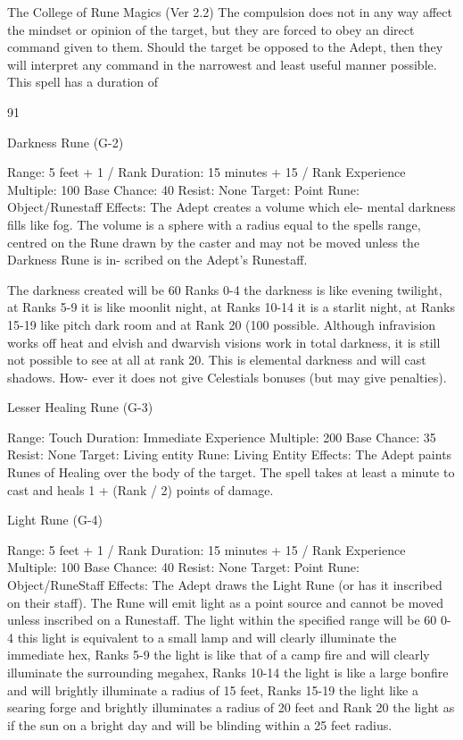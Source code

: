 \begin{Chapter}{The College of Rune Magics (Ver 2.2)}
The  compulsion  does  not  in  any  way  affect  the 
mindset or opinion of the target, but they are forced 
to  obey  an direct  command  given  to them.  Should 
the  target  be  opposed  to  the  Adept,  then  they  will 
interpret  any  command  in  the  narrowest  and  least 
useful manner possible. This spell has a duration of 

91 

Darkness Rune (G-2) 

Range: 5 feet + 1 / Rank 
Duration: 15 minutes + 15 / Rank 
Experience Multiple: 100 
Base Chance: 40%
Resist: None 
Target: Point 
Rune: Object/Runestaff 
Effects:  The  Adept  creates  a  volume  which  ele-
mental  darkness  fills  like  fog.  The  volume  is  a 
sphere  with  a  radius  equal  to  the  spells  range, 
centred  on  the  Rune  drawn  by  the  caster  and  may 
not  be  moved  unless  the  Darkness  Rune  is  in-
scribed on the Adept’s Runestaff. 

The darkness created will be 60%
Ranks  0-4 the  darkness is  like  evening  twilight, at 
Ranks 5-9 it is like moonlit night, at Ranks 10-14 it 
is  a  starlit  night,  at  Ranks  15-19  like  pitch  dark 
room  and  at  Rank  20  (100%
possible.  Although  infravision  works  off  heat  and 
elvish and dwarvish visions work in total darkness, 
it is still not possible to see at all at rank 20. This is 
elemental  darkness  and  will  cast  shadows.  How-
ever  it  does  not  give  Celestials  bonuses  (but  may 
give penalties). 

Lesser Healing Rune (G-3) 

Range: Touch 
Duration: Immediate 
Experience Multiple: 200 
Base Chance: 35%
Resist: None 
Target: Living entity 
Rune: Living Entity 
Effects:  The  Adept  paints  Runes  of  Healing  over 
the  body  of  the  target.  The  spell  takes  at  least  a 
minute  to  cast  and  heals  1  +  (Rank  /  2)  points  of 
damage. 

Light Rune (G-4) 

Range: 5 feet + 1 / Rank 
Duration: 15 minutes + 15 / Rank 
Experience Multiple: 100 
Base Chance: 40%
Resist: None 
Target: Point 
Rune: Object/RuneStaff 
Effects: The Adept draws the Light Rune (or has it 
inscribed  on  their  staff).  The  Rune  will  emit  light 
as  a  point  source  and  cannot  be  moved  unless 
inscribed  on  a  Runestaff.  The  light  within  the 
specified range will be 60%
0-4 this light is equivalent to a small lamp and will 
clearly  illuminate  the  immediate  hex,  Ranks  5-9 
the light is like that of a camp fire and will clearly 
illuminate  the  surrounding  megahex,  Ranks  10-14 
the  light  is  like  a  large  bonfire  and  will  brightly 
illuminate a radius of 15 feet, Ranks 15-19 the light 
like  a  searing  forge  and  brightly  illuminates  a 
radius of 20 feet and Rank 20 the light as if the sun 
on  a  bright  day  and  will  be  blinding  within  a  25 
feet radius. 


\end{Chapter}
